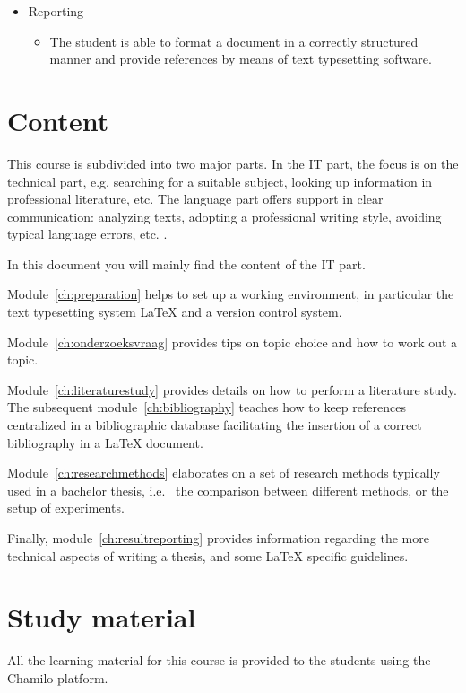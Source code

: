 \begin{itemize}
  \item Reporting
        \begin{itemize}        
           \item The student is able to format a document in a correctly structured manner and provide references by means of text typesetting software.
        \end{itemize}
\end{itemize}

\section{Content}
\label{sec:studycontent}
This course is subdivided into two major parts. In the IT part, the focus is on the technical part, e.g. searching for a suitable subject, looking up information in professional literature, etc. The language part offers support in clear communication: analyzing texts, adopting a professional writing style, avoiding typical language errors, etc. .

In this document you will mainly find the content of the IT part.

Module~\ref{ch:preparation} helps to set up a working environment, in particular the text typesetting system {\LaTeX} and a version control system.

Module~\ref{ch:onderzoeksvraag} provides tips on topic choice and how to work out a topic.

Module~\ref{ch:literaturestudy} provides details on how to perform a literature study. The subsequent module~\ref{ch:bibliography} teaches how to keep references centralized in a bibliographic database facilitating the insertion of a correct bibliography in a {\LaTeX} document.

Module~\ref{ch:researchmethods} elaborates on a set of research methods typically used in a bachelor thesis, i.e. \ the comparison between different methods, or the setup of experiments. 

Finally, module~\ref{ch:resultreporting} provides information regarding the more technical aspects of writing a thesis, and some {\LaTeX} specific guidelines.

\section{Study material}
\label{sec:studymaterial}

All the learning material for this course is provided to the students using the Chamilo platform. 


